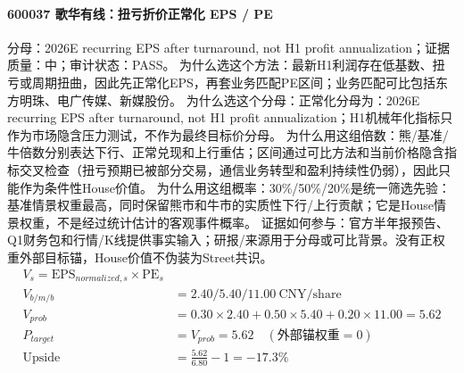 \paragraph{600037 歌华有线：扭亏折价正常化 EPS / PE}
分母：2026E recurring EPS after turnaround, not H1 profit annualization；证据质量：中；审计状态：PASS。
为什么选这个方法：最新H1利润存在低基数、扭亏或周期扭曲，因此先正常化EPS，再套业务匹配PE区间；业务匹配可比包括东方明珠、电广传媒、新媒股份。
为什么选这个分母：正常化分母为：2026E recurring EPS after turnaround, not H1 profit annualization；H1机械年化指标只作为市场隐含压力测试，不作为最终目标价分母。
为什么用这组倍数：熊/基准/牛倍数分别表达下行、正常兑现和上行重估；区间通过可比方法和当前价格隐含指标交叉检查（扭亏预期已被部分交易，通信业务转型和盈利持续性仍弱），因此只能作为条件性House价值。
为什么用这组概率：30\%/50\%/20\%是统一筛选先验：基准情景权重最高，同时保留熊市和牛市的实质性下行/上行贡献；它是House情景权重，不是经过统计估计的客观事件概率。
证据如何参与：官方半年报预告、Q1财务包和行情/K线提供事实输入；研报/来源用于分母或可比背景。没有正权重外部目标锚，House价值不伪装为Street共识。
\begin{align*}
V_s=\mathrm{EPS}_{normalized,s}\times \mathrm{PE}_s\\
V_{b/m/b} &= 2.40/5.40/11.00\ \mathrm{CNY/share}\\
V_{prob} &= 0.30\times 2.40+0.50\times 5.40+0.20\times 11.00=5.62\\
P_{target} &= V_{prob}=5.62\quad(\text{外部锚权重}=0)\\
\mathrm{Upside} &= \frac{5.62}{6.80}-1=-17.3\%\\
\end{align*}


